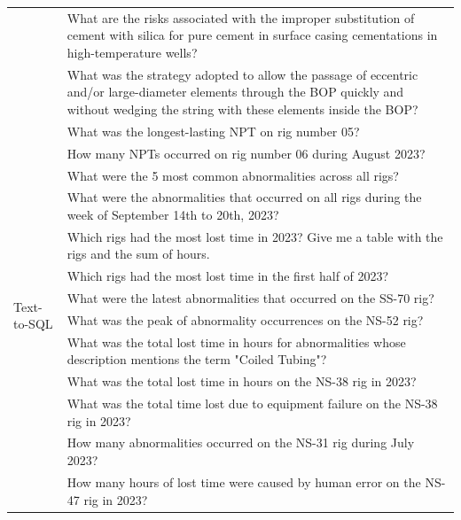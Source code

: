 \begin{table}[h]
\begin{tabular}{|p{.1\linewidth}|p{.9\linewidth}|}
                & What are the risks associated with the improper substitution of cement with silica for pure cement in surface casing cementations in high-temperature wells? \\ \cline{2-2}
                & What was the strategy adopted to allow the passage of eccentric and/or large-diameter elements through the BOP quickly and without wedging the string with these elements inside the BOP? \\ \cline{2-2}
                \hline                
                \multirow{15}{*}{Text-to-SQL} & What was the longest-lasting NPT on rig number 05? \\ \cline{2-2}
                & How many NPTs occurred on rig number 06 during August 2023? \\ \cline{2-2}
                & What were the 5 most common abnormalities across all rigs? \\ \cline{2-2}
                & What were the abnormalities that occurred on all rigs during the week of September 14th to 20th, 2023? \\ \cline{2-2}
                & Which rigs had the most lost time in 2023? Give me a table with the rigs and the sum of hours. \\ \cline{2-2}
                & Which rigs had the most lost time in the first half of 2023? \\ \cline{2-2}
                & What were the latest abnormalities that occurred on the SS-70 rig? \\ \cline{2-2}
                & What was the peak of abnormality occurrences on the NS-52 rig? \\ \cline{2-2}
                & What was the total lost time in hours for abnormalities whose description mentions the term "Coiled Tubing"? \\ \cline{2-2}
                & What was the total lost time in hours on the NS-38 rig in 2023? \\ \cline{2-2}
                & What was the total time lost due to equipment failure on the NS-38 rig in 2023? \\ \cline{2-2}
                & How many abnormalities occurred on the NS-31 rig during July 2023? \\ \cline{2-2}
                & How many hours of lost time were caused by human error on the NS-47 rig in 2023? \\ \cline{2-2}

\end{tabular}
\end{table}
